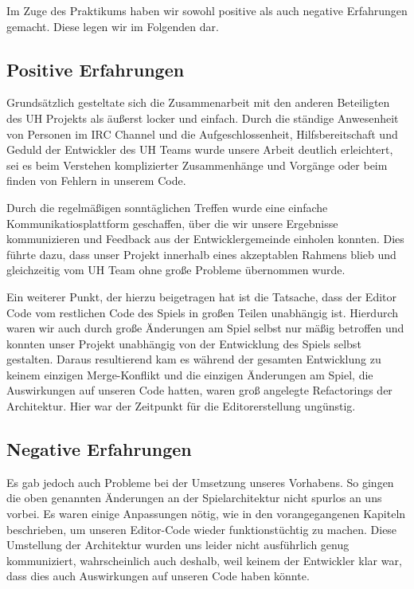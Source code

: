 Im Zuge des Praktikums haben wir sowohl positive als auch negative Erfahrungen
gemacht. Diese legen wir im Folgenden dar.

\subsection{Positive Erfahrungen}
Grundsätzlich gesteltate sich die Zusammenarbeit mit den anderen Beteiligten
des UH Projekts als äußerst locker und einfach. Durch die ständige Anwesenheit
von Personen im IRC Channel und die Aufgeschlossenheit, Hilfsbereitschaft und
Geduld der Entwickler des UH Teams wurde unsere Arbeit deutlich erleichtert,
sei es beim Verstehen komplizierter Zusammenhänge und Vorgänge oder beim
finden von Fehlern in unserem Code.

Durch die regelmäßigen sonntäglichen Treffen wurde eine einfache
Kommunikatiosplattform geschaffen, über die wir unsere Ergebnisse kommunizieren
und Feedback aus der Entwicklergemeinde einholen konnten. Dies führte dazu,
dass unser Projekt innerhalb eines akzeptablen Rahmens blieb und gleichzeitig
vom UH Team ohne große Probleme übernommen wurde.

Ein weiterer Punkt, der hierzu beigetragen hat ist die Tatsache, dass der Editor
Code vom restlichen Code des Spiels in großen Teilen unabhängig ist.
Hierdurch waren wir auch durch große Änderungen am Spiel selbst nur mäßig
betroffen und konnten unser Projekt unabhängig von der Entwicklung des Spiels
selbst gestalten. Daraus resultierend kam es während der gesamten Entwicklung zu
keinem einzigen Merge-Konflikt und die einzigen Änderungen am Spiel, die
Auswirkungen auf unseren Code hatten, waren groß angelegte Refactorings der
Architektur. Hier war der Zeitpunkt für die Editorerstellung ungünstig.

\subsection{Negative Erfahrungen}
Es gab jedoch auch Probleme bei der Umsetzung unseres Vorhabens.
So gingen die oben genannten Änderungen an der Spielarchitektur nicht spurlos
an uns vorbei. Es waren einige Anpassungen nötig, wie in den vorangegangenen Kapiteln
beschrieben, um unseren Editor-Code wieder funktionstüchtig zu machen.
Diese Umstellung der Architektur wurden uns leider nicht ausführlich genug
kommuniziert, wahrscheinlich auch deshalb, weil keinem der Entwickler klar war,
dass dies auch Auswirkungen auf unseren Code haben könnte.

